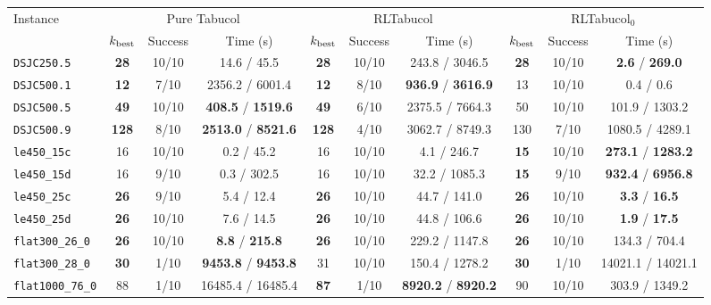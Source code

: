 \begin{tabular}{@{}lccccccccc@{}}
\toprule
Instance & \multicolumn{3}{c}{Pure Tabucol} & \multicolumn{3}{c}{RLTabucol} & \multicolumn{3}{c}{RLTabucol$_0$}\\
 & $k_{\rm best}$ & Success & Time (s) & $k_{\rm best}$ & Success & Time (s) & $k_{\rm best}$ & Success & Time (s)\\
\midrule
\texttt{DSJC250.5} & \textbf{28} & 10/10 & 14.6 / 45.5 & \textbf{28} & 10/10 & 243.8 / 3046.5 & \textbf{28} & 10/10 & \textbf{2.6} / \textbf{269.0} \\
\texttt{DSJC500.1} & \textbf{12} & 7/10 & 2356.2 / 6001.4 & \textbf{12} & 8/10 & \textbf{936.9} / \textbf{3616.9} & 13 & 10/10 & 0.4 / 0.6 \\
\texttt{DSJC500.5} & \textbf{49} & 10/10 & \textbf{408.5} / \textbf{1519.6} & \textbf{49} & 6/10 & 2375.5 / 7664.3 & 50 & 10/10 & 101.9 / 1303.2 \\
\texttt{DSJC500.9} & \textbf{128} & 8/10 & \textbf{2513.0} / \textbf{8521.6} & \textbf{128} & 4/10 & 3062.7 / 8749.3 & 130 & 7/10 & 1080.5 / 4289.1 \\
\texttt{le450\_15c} & 16 & 10/10 & 0.2 / 45.2 & 16 & 10/10 & 4.1 / 246.7 & \textbf{15} & 10/10 & \textbf{273.1} / \textbf{1283.2} \\
\texttt{le450\_15d} & 16 & 9/10 & 0.3 / 302.5 & 16 & 10/10 & 32.2 / 1085.3 & \textbf{15} & 9/10 & \textbf{932.4} / \textbf{6956.8} \\
\texttt{le450\_25c} & \textbf{26} & 9/10 & 5.4 / 12.4 & \textbf{26} & 10/10 & 44.7 / 141.0 & \textbf{26} & 10/10 & \textbf{3.3} / \textbf{16.5} \\
\texttt{le450\_25d} & \textbf{26} & 10/10 & 7.6 / 14.5 & \textbf{26} & 10/10 & 44.8 / 106.6 & \textbf{26} & 10/10 & \textbf{1.9} / \textbf{17.5} \\
\texttt{flat300\_26\_0} & \textbf{26} & 10/10 & \textbf{8.8} / \textbf{215.8} & \textbf{26} & 10/10 & 229.2 / 1147.8 & \textbf{26} & 10/10 & 134.3 / 704.4 \\
\texttt{flat300\_28\_0} & \textbf{30} & 1/10 & \textbf{9453.8} / \textbf{9453.8} & 31 & 10/10 & 150.4 / 1278.2 & \textbf{30} & 1/10 & 14021.1 / 14021.1 \\
\texttt{flat1000\_76\_0} & 88 & 1/10 & 16485.4 / 16485.4 & \textbf{87} & 1/10 & \textbf{8920.2} / \textbf{8920.2} & 90 & 10/10 & 303.9 / 1349.2 \\
\bottomrule
\end{tabular}
